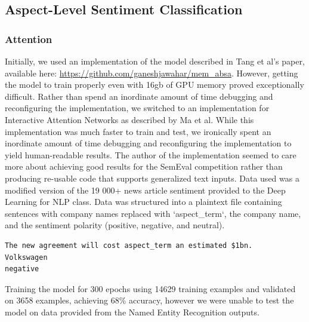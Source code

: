 \documentclass[12pt,a4paper]{article}
\begin{document}
\subsection{Aspect-Level Sentiment Classification}
\subsubsection{Attention}
Initially, we used an implementation of the model described in Tang et al's paper\cite{Tang2016}, available here:  \url{https://github.com/ganeshjawahar/mem_absa}. However, getting the model to train properly even with 16gb of GPU memory proved exceptionally difficult. Rather than spend an inordinate amount of time debugging and reconfiguring the implementation, we switched to an implementation for Interactive Attention Networks as described by Ma et al\cite{Ma2017}. While this implementation was much faster to train and test, we ironically spent an inordinate amount of time debugging and reconfiguring the implementation to yield human-readable results. The author of the implementation seemed to care more about achieving good results for the SemEval competition rather than producing re-usable code that supports generalized text inputs. Data used was a modified version of the 19 000+ news article sentiment provided to the Deep Learning for NLP class. Data was structured into a plaintext file containing sentences with company names replaced with `aspect\_term`, the company name, and the sentiment polarity (positive, negative, and neutral).
\begin{verbatim}
The new agreement will cost aspect_term an estimated $1bn.
Volkswagen
negative
\end{verbatim}

Training the model for 300 epochs using 14629 training examples and validated on 3658 examples, achieving 68\% accuracy, however we were unable to test the model on data provided from the Named Entity Recognition outputs.
\end{document}
